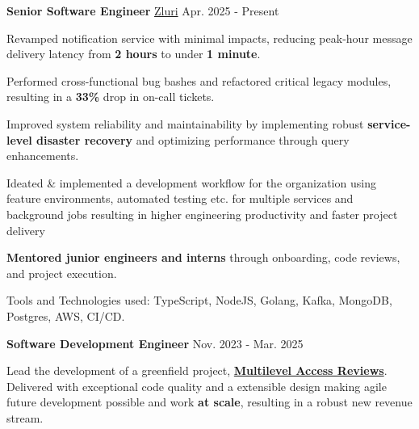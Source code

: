 \vspace{-3mm}


\vspace{-1mm}
\begin{cventries}

\cventry
{\textbf{Senior Software Engineer}} %
{\href{https://www.zluri.com/}{Zluri}} %
{Apr. 2025 - Present} %
{} %
{\begin{cvitems} %
    \item {Revamped notification service with minimal impacts, reducing peak-hour message delivery latency from \textbf{2 hours} to under \textbf{1 minute}.}
    \item {Performed cross-functional bug bashes and refactored critical legacy modules, resulting in a \textbf{33\%} drop in on-call tickets.}
    \item {Improved system reliability and maintainability by implementing robust \textbf{service-level disaster recovery} and optimizing performance through query enhancements.}
    \item {Ideated \& implemented a development workflow for the organization using feature environments, automated testing etc. for multiple services and background jobs resulting in higher engineering productivity and faster project delivery}
    \item {\textbf{Mentored junior engineers and interns} through onboarding, code reviews, and project execution.}
    \item {Tools and Technologies used: TypeScript, NodeJS, Golang, Kafka, MongoDB, Postgres, AWS, CI/CD.}
\end{cvitems}}
\vspace{1mm}
\cventry
{\textbf{Software Development Engineer}} %
{} %
{Nov. 2023 - Mar. 2025} %
{} %
{\begin{cvitems} %
    \item {Lead the development of a greenfield project, \href{https://www.linkedin.com/posts/zluri_ditch-the-chaos-of-complex-access-reviews-activity-7209563170468691970-MeRA}{\textbf{Multilevel Access Reviews}}. Delivered with exceptional code quality and a extensible design making agile future development possible and work \textbf{at scale}, resulting in a robust new revenue stream.}

\end{cvitems}}
\end{cventries}
